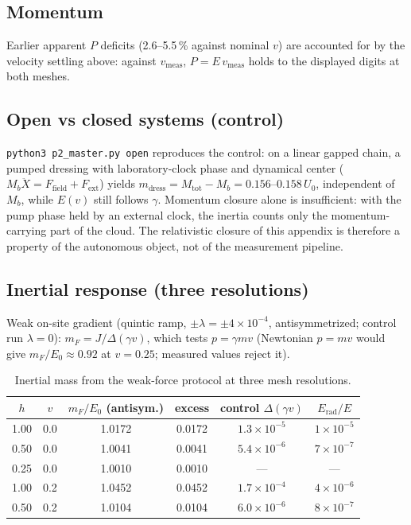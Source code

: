 \documentclass[11pt,a4paper]{article}
\theoremstyle{plain}
\theoremstyle{remark}
\begin{document}
\subsection{Momentum}
Earlier apparent $P$ deficits (2.6--5.5\,\% against nominal $v$) are accounted for by the velocity settling above: against $v_{\text{meas}}$, $P = E\,v_{\text{meas}}$ holds to the displayed digits at both meshes.

\subsection{Open vs closed systems (control)}
\label{app:breathers_open}
\texttt{python3 p2\_master.py open} reproduces the control: on a linear gapped chain, a pumped dressing with laboratory-clock phase and dynamical center ($M_b\ddot X = F_{\text{field}} + F_{\text{ext}}$) yields $m_{\text{dress}} = M_{\text{tot}} - M_b = 0.156$--$0.158\,U_0$, independent of $M_b$, while $E(v)$ still follows $\gamma$. Momentum closure alone is insufficient: with the pump phase held by an external clock, the inertia counts only the momentum-carrying part of the cloud. The relativistic closure of this appendix is therefore a property of the autonomous object, not of the measurement pipeline.

\subsection{Inertial response (three resolutions)}
\label{app:breathers_force}
Weak on-site gradient (quintic ramp, $\pm\lambda = \pm 4\times10^{-4}$, antisymmetrized; control run $\lambda = 0$): $m_F = J/\Delta(\gamma v)$, which tests $p = \gamma m v$ (Newtonian $p = mv$ would give $m_F/E_0 \approx 0.92$ at $v = 0.25$; measured values reject it).

\begin{table}[htbp]
\centering\small
\begin{tabular}{cccccc}
\toprule
$h$ & $v$ & $m_F/E_0$ (antisym.) & excess & control $\Delta(\gamma v)$ & $E_{\text{rad}}/E$ \\
\midrule
1.00 & 0.0 & 1.0172 & 0.0172 & $1.3\times10^{-5}$ & $1\times10^{-5}$ \\
0.50 & 0.0 & 1.0041 & 0.0041 & $5.4\times10^{-6}$ & $7\times10^{-7}$ \\
0.25 & 0.0 & 1.0010 & 0.0010 & --- & --- \\
1.00 & 0.2 & 1.0452 & 0.0452 & $1.7\times10^{-4}$ & $4\times10^{-6}$ \\
0.50 & 0.2 & 1.0104 & 0.0104 & $6.0\times10^{-6}$ & $8\times10^{-7}$ \\
\bottomrule
\end{tabular}
\caption{Inertial mass from the weak-force protocol at three mesh resolutions.}
\label{tab:breather_force}
\end{table}
\end{document}
